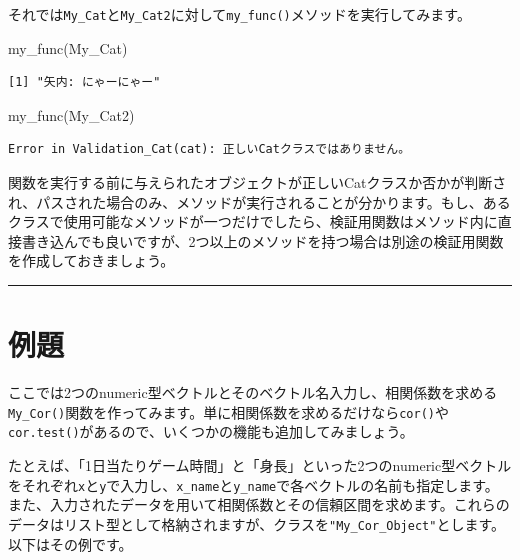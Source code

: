 \documentclass[
  a4paper,
  pandoc,
  ja=standard,
  jafont=haranoaji]{bxjsbook}
\newenvironment{Shaded}{\begin{snugshade}}{\end{snugshade}}
\newcommand{\FunctionTok}[1]{\textcolor[rgb]{0.28,0.35,0.67}{#1}}
\newcommand{\NormalTok}[1]{\textcolor[rgb]{0.00,0.48,0.65}{#1}}
\begin{document}
それでは\texttt{My\_Cat}と\texttt{My\_Cat2}に対して\texttt{my\_func()}メソッドを実行してみます。

\begin{Shaded}
\begin{Highlighting}[numbers=left,,]
\FunctionTok{my\_func}\NormalTok{(My\_Cat)}
\end{Highlighting}
\end{Shaded}

\begin{verbatim}
[1] "矢内: にゃーにゃー"
\end{verbatim}

\begin{Shaded}
\begin{Highlighting}[numbers=left,,]
\FunctionTok{my\_func}\NormalTok{(My\_Cat2)}
\end{Highlighting}
\end{Shaded}

\begin{verbatim}
Error in Validation_Cat(cat): 正しいCatクラスではありません。
\end{verbatim}

関数を実行する前に与えられたオブジェクトが正しいCatクラスか否かが判断され、パスされた場合のみ、メソッドが実行されることが分かります。もし、あるクラスで使用可能なメソッドが一つだけでしたら、検証用関数はメソッド内に直接書き込んでも良いですが、2つ以上のメソッドを持つ場合は別途の検証用関数を作成しておきましょう。

\begin{center}\rule{0.5\linewidth}{0.5pt}\end{center}

\hypertarget{sec-oop_example}{%
\section{例題}\label{sec-oop_example}}

ここでは2つのnumeric型ベクトルとそのベクトル名入力し、相関係数を求める\texttt{My\_Cor()}関数を作ってみます。単に相関係数を求めるだけなら\texttt{cor()}や\texttt{cor.test()}があるので、いくつかの機能も追加してみましょう。

たとえば、「1日当たりゲーム時間」と「身長」といった2つのnumeric型ベクトルをそれぞれ\texttt{x}と\texttt{y}で入力し、\texttt{x\_name}と\texttt{y\_name}で各ベクトルの名前も指定します。また、入力されたデータを用いて相関係数とその信頼区間を求めます。これらのデータはリスト型として格納されますが、クラスを\texttt{"My\_Cor\_Object"}とします。以下はその例です。
\end{document}
